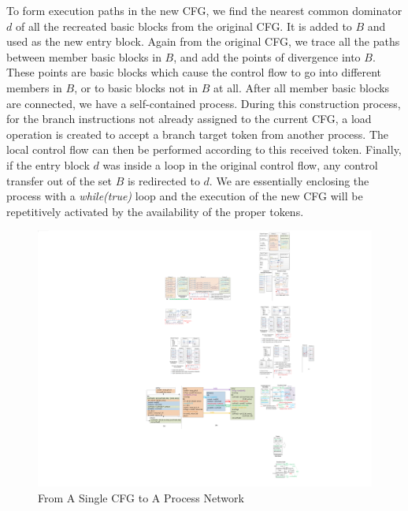\documentclass{sig-alternate}
\begin{document}
To form execution paths in the new CFG, we find the nearest common dominator $d$ of all the recreated basic blocks from the original CFG. It is added to $B$ and used as the new entry block. Again from the original CFG, we trace all the paths between member basic blocks in $B$, and add the points of divergence into $B$. These points are basic blocks which cause
the control flow to go into different members in $B$, or to basic blocks not in $B$ at all.
After all member basic blocks are connected, we have a self-contained process. 
During this construction process, for the branch instructions not already assigned to the current CFG, a load operation is created to accept a branch target token from another process. The local control flow can then be performed according to this received token. 
Finally, if the entry block $d$ was inside a loop in the original control flow, any control transfer out of the set $B$ is redirected to $d$. We are essentially enclosing the process with a \textit{while(true)} loop and the execution of the new CFG will be repetitively activated by the availability of the proper tokens.


\begin{figure}[htp]
\begin{center}
\includegraphics[width=1.0\linewidth]{fig/convert.pdf}
\caption{From A Single CFG to A Process Network
\label{fig:totalFlow}}
\end{center}
\vspace{-2.0em}
\end{figure}
\end{document}
